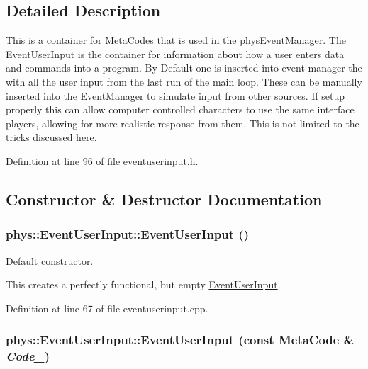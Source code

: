 \subsection{Detailed Description}
This is a container for MetaCodes that is used in the physEventManager. The \hyperlink{classphys_1_1EventUserInput}{EventUserInput} is the container for information about how a user enters data and commands into a program. By Default one is inserted into event manager the with all the user input from the last run of the main loop. These can be manually inserted into the \hyperlink{classphys_1_1EventManager}{EventManager} to simulate input from other sources. If setup properly this can allow computer controlled characters to use the same interface players, allowing for more realistic response from them. This is not limited to the tricks discussed here. 

Definition at line 96 of file eventuserinput.h.



\subsection{Constructor \& Destructor Documentation}
\hypertarget{classphys_1_1EventUserInput_ae7358d184021306da8979000c225845e}{
\subsubsection[{EventUserInput}]{\setlength{\rightskip}{0pt plus 5cm}phys::EventUserInput::EventUserInput ()}}
\label{d7/df5/classphys_1_1EventUserInput_ae7358d184021306da8979000c225845e}


Default constructor. 

This creates a perfectly functional, but empty \hyperlink{classphys_1_1EventUserInput}{EventUserInput}. 

Definition at line 67 of file eventuserinput.cpp.

\hypertarget{classphys_1_1EventUserInput_af54d4604d18b25a2dc99a4a3090b9f1d}{
\subsubsection[{EventUserInput}]{\setlength{\rightskip}{0pt plus 5cm}phys::EventUserInput::EventUserInput (const {\bf MetaCode} \& {\em Code\_\-})}}
\label{d7/df5/classphys_1_1EventUserInput_af54d4604d18b25a2dc99a4a3090b9f1d}


